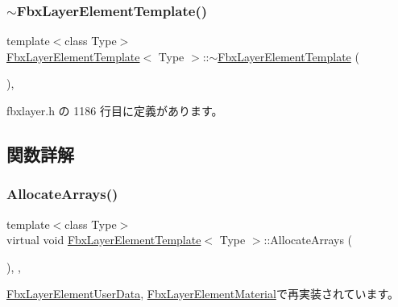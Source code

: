 \subsubsection{\texorpdfstring{$\sim$\+Fbx\+Layer\+Element\+Template()}{~FbxLayerElementTemplate()}}
{\footnotesize\ttfamily template$<$class Type$>$ \\
\hyperlink{class_fbx_layer_element_template}{Fbx\+Layer\+Element\+Template}$<$ Type $>$\+::$\sim$\hyperlink{class_fbx_layer_element_template}{Fbx\+Layer\+Element\+Template} (\begin{DoxyParamCaption}{ }\end{DoxyParamCaption})\hspace{0.3cm}{\ttfamily [inline]}, {\ttfamily [protected]}}



 fbxlayer.\+h の 1186 行目に定義があります。



\subsection{関数詳解}
\mbox{\label{class_fbx_layer_element_template_aa6d432c5865fcda1b58376119f1fcaa8}} 
\subsubsection{\texorpdfstring{Allocate\+Arrays()}{AllocateArrays()}}
{\footnotesize\ttfamily template$<$class Type$>$ \\
virtual void \hyperlink{class_fbx_layer_element_template}{Fbx\+Layer\+Element\+Template}$<$ Type $>$\+::Allocate\+Arrays (\begin{DoxyParamCaption}{ }\end{DoxyParamCaption})\hspace{0.3cm}{\ttfamily [inline]}, {\ttfamily [protected]}, {\ttfamily [virtual]}}



\hyperlink{class_fbx_layer_element_user_data_afd9b9cec3547a1a5ccde15f274128d2a}{Fbx\+Layer\+Element\+User\+Data}, \hyperlink{class_fbx_layer_element_material_a5bf99bae72fa4a516eed88e04a66b7ff}{Fbx\+Layer\+Element\+Material}で再実装されています。



